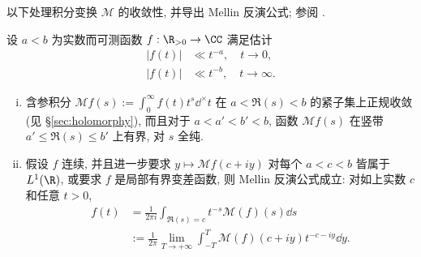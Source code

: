 以下处理积分变换 $\mathcal{M}$ 的收敛性, 并导出 Mellin 反演公式; 参阅 \cite[\S 1.29]{Ti86}.
\begin{proposition}\label{prop:Mellin-estimate}
	设 $a < b$ 为实数而可测函数 $f: \R_{> 0} \to \CC$ 满足估计
	\begin{align*}
		|f(t)| & \ll t^{-a}, \quad t \to 0, \\
		|f(t)| & \ll t^{-b}, \quad t \to \infty.
	\end{align*}
	\begin{enumerate}[(i)]
		\item 含参积分 $\mathcal{M}f(s) := \int_0^\infty f(t)t^s \dd^\times t$ 在 $a < \Re(s) < b$ 的紧子集上正规收敛 (见 \S\ref{sec:holomorphy}), 而且对于 $a < a' < b' < b$, 函数 $\mathcal{M}f(s)$ 在竖带 $a' \leq \Re(s) \leq b'$ 上有界, 对 $s$ 全纯.
		\item 假设 $f$ 连续, 并且进一步要求 $y \mapsto \mathcal{M}f(c + iy)$ 对每个 $a < c < b$ 皆属于 $L^1(\R)$, 或要求 $f$ 是局部有界变差函数, 则 Mellin 反演公式成立: 对如上实数 $c$ 和任意 $t > 0$,
		\begin{align*}
			f(t) & = \frac{1}{2\pi i} \int_{\Re(s) = c} t^{-s} \mathcal{M}(f)(s) \dd s \\
			& := \frac{1}{2\pi} \lim_{T \to +\infty} \int_{-T}^T \mathcal{M}(f)(c+iy) t^{-c-iy} \dd y.
		\end{align*}
	\end{enumerate}
\end{proposition}
